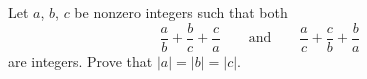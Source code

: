 Let $a$, $b$, $c$ be nonzero integers such that both
\[
\dfrac{a}{b}+\dfrac{b}{c}+\dfrac{c}{a}\qquad\text{and}\qquad\dfrac{a}{c}+\dfrac{c}{b}+\dfrac{b}{a}
\]
are integers. Prove that $|a|=|b|=|c|$.

